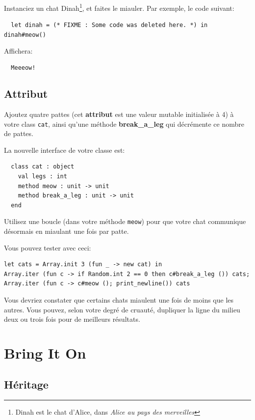 \documentclass[a4paper]{article}
\begin{document}
Instanciez un chat Dinah\footnote{Dinah est le chat d'Alice, dans \textit{Alice
au pays des merveilles}}, et faites le miauler. Par exemple, le code suivant:

\vspace{3mm}
\verb|  let dinah = (* FIXME : Some code was deleted here. *) in dinah#meow()|
\vspace{3mm}

Affichera:

\vspace{3mm}
\verb|  Meeeow!|
\vspace{3mm}

\subsection{Attribut}

Ajoutez quatre pattes (cet \textbf{attribut} est une valeur mutable initialisée
à 4) à votre class \verb|cat|, ainsi qu'une méthode \textbf{break\_a\_leg} qui
décrémente ce nombre de pattes.

La nouvelle
interface de votre classe est:
\vspace{3mm}
\begin{verbatim}
  class cat : object
    val legs : int
    method meow : unit -> unit
    method break_a_leg : unit -> unit
  end
\end{verbatim}
\vspace{3mm}

Utilisez une boucle (dans votre méthode \verb|meow|) pour que votre chat
communique désormais en miaulant une fois par patte.

\newpage

Vous pouvez tester avec ceci:

\begin{verbatim}
let cats = Array.init 3 (fun _ -> new cat) in
Array.iter (fun c -> if Random.int 2 == 0 then c#break_a_leg ()) cats;
Array.iter (fun c -> c#meow (); print_newline()) cats
\end{verbatim}

Vous devriez constater que certains chats miaulent une fois de moins que les
autres. Vous pouvez, selon votre degré de cruauté, dupliquer la ligne du milieu
deux ou trois fois pour de meilleurs résultats.

\section{Bring It On}

\subsection{Héritage}
\end{document}
